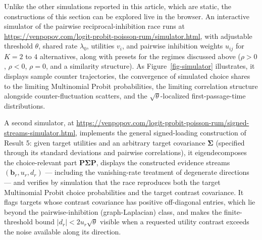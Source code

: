 \documentclass[
  man,
  floatsintext,
  longtable,
  a4paper,
  nolmodern,
  notxfonts,
  notimes,
  colorlinks=true,linkcolor=blue,citecolor=blue,urlcolor=blue]{apa7}
\begin{document}
\begin{tcolorbox}[enhanced jigsaw, arc=.35mm, bottomrule=.15mm, bottomtitle=1mm, breakable, colback=white, colbacktitle=quarto-callout-tip-color!10!white, colframe=quarto-callout-tip-color-frame, coltitle=black, left=2mm, leftrule=.75mm, opacityback=0, opacitybacktitle=0.6, rightrule=.15mm, title={Explore this model interactively}, titlerule=0mm, toprule=.15mm, toptitle=1mm]

Unlike the other simulations reported in this article, which are static,
the constructions of this section can be explored live in the browser.
An interactive simulator of the pairwise reciprocal-inhibition race runs
at \url{https://venpopov.com/logit-probit-poisson-rum/simulator.html},
with adjustable threshold \(\theta\), shared rate \(\lambda_0\),
utilities \(v_i\), and pairwise inhibition weights \(u_{ij}\) for
\(K = 2\) to \(4\) alternatives, along with presets for the regimes
discussed above (\(\rho > 0\), \(\rho < 0\), \(\rho = 0\), and a
similarity structure). As Figure~\ref{fig-simulator} illustrates, it
displays sample counter trajectories, the convergence of simulated
choice shares to the limiting Multinomial Probit probabilities, the
limiting correlation structure alongside counter-fluctuation scatters,
and the \(\sqrt{\theta}\)-localized first-passage-time distributions.

A second simulator, at
\url{https://venpopov.com/logit-probit-poisson-rum/signed-streams-simulator.html},
implements the general signed-loading construction of Result 5: given
target utilities and an arbitrary target covariance
\(\boldsymbol\Sigma\) (specified through its standard deviations and
pairwise correlations), it eigendecomposes the choice-relevant part
\(\mathbf P\boldsymbol\Sigma\mathbf P\), displays the constructed
evidence streams \((\mathbf b_r, u_r, d_r)\) --- including the
vanishing-rate treatment of degenerate directions --- and verifies by
simulation that the race reproduces both the target Multinomial Probit
choice probabilities and the target contrast covariance. It flags
targets whose contrast covariance has positive off-diagonal entries,
which lie beyond the pairwise-inhibition (graph-Laplacian) class, and
makes the finite-threshold bound \(|d_r| < 2u_r\sqrt{\theta}\) visible
when a requested utility contrast exceeds the noise available along its
direction.

\end{tcolorbox}
\end{document}
